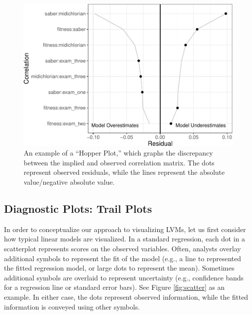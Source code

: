 \documentclass[
  english,
  doc]{apa6}
\begin{document}
\begin{figure}
\centering
\includegraphics{flexplavaan_draft_files/figure-latex/hopper-1.pdf}
\caption{\label{fig:hopper}An example of a ``Hopper Plot,'' which graphs the discrepancy between the implied and observed correlation matrix. The dots represent observed residuals, while the lines represent the absolute value/negative absolute value.}
\end{figure}

\hypertarget{diagnostic-plots-trail-plots}{%
\subsection{Diagnostic Plots: Trail Plots}\label{diagnostic-plots-trail-plots}}

In order to conceptualize our approach to visualizing LVMs, let us first consider how typical linear models are visualized. In a standard regression, each dot in a scatterplot represents scores on the observed variables. Often, analysts overlay additional symbols to represent the fit of the model (e.g., a line to represented the fitted regression model, or large dots to represent the mean). Sometimes additional symbols are overlaid to represent uncertainty (e.g., confidence bands for a regression line or standard error bars). See Figure \ref{fig:scatter} as an example. In either case, the dots represent observed information, while the fitted information is conveyed using other symbols.
\end{document}

